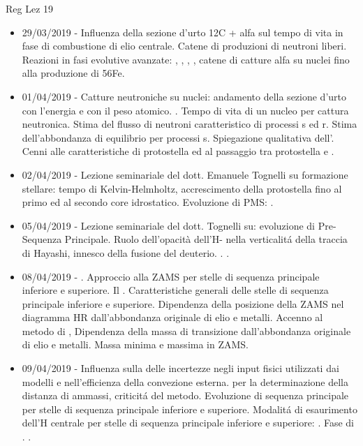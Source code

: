 \begin{frame}[allowframebreaks]{Reg Lez 19}
\begin{itemize}
\item 29/03/2019 - Influenza della sezione d'urto 12C + alfa sul tempo di vita in fase di combustione di elio centrale. Catene di {produzioni di neutroni liberi}. Reazioni in fasi evolutive avanzate: , ,  , , catene di catture alfa su nuclei fino alla {produzione di 56Fe}.
\item 01/04/2019 - Catture neutroniche su nuclei: andamento della sezione d'urto con l'energia e con il peso atomico. . Tempo di vita di un nucleo per cattura neutronica. Stima del flusso di neutroni caratteristico di processi s ed r. Stima dell'abbondanza di equilibrio per processi s. Spiegazione qualitativa dell'. Cenni alle caratteristiche di protostella ed al passaggio tra protostella e .
\item 02/04/2019 - Lezione seminariale del dott. Emanuele Tognelli su formazione stellare: tempo di Kelvin-Helmholtz, accrescimento della protostella fino al primo ed al secondo core idrostatico. Evoluzione di PMS: .
\item 05/04/2019 - Lezione seminariale del dott. Tognelli su: evoluzione di Pre-Sequenza Principale. Ruolo dell'opacità dell'H- nella verticalit\'a della traccia di Hayashi, innesco della fusione del deuterio. . .
\item 08/04/2019 - . Approccio alla ZAMS per stelle di sequenza principale inferiore e superiore. Il . Caratteristiche generali delle stelle di sequenza principale inferiore e superiore. Dipendenza della posizione della ZAMS nel diagramma HR dall'abbondanza originale di elio e metalli. Accenno al metodo di , Dipendenza della massa di transizione dall'abbondanza originale di elio e metalli. Massa minima e massima in ZAMS.
\item 09/04/2019 - Influenza sulla  delle incertezze negli input fisici utilizzati dai modelli e nell'efficienza della convezione esterna.  per la determinazione della distanza di ammassi, criticit\'a del metodo. Evoluzione di sequenza principale per stelle di sequenza principale inferiore e superiore. Modalit\'a di esaurimento dell'H centrale per stelle di sequenza principale inferiore e superiore: . Fase di . .

\end{itemize}
\end{frame}
